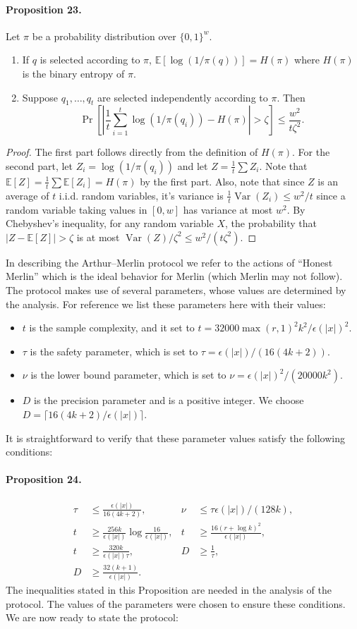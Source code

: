\documentclass[10pt,a4paper]{article}
\begin{document}
\paragraph{Proposition 23.} Let $\pi$ be a probability distribution over $\{0,1\}^w$.
\begin{enumerate}\item If $q$ is selected according to $\pi$, $\mathbb E[\log(1/\pi(q))]=H(\pi)$ where $H(\pi)$ is the binary entropy of $\pi$.
\item Suppose $q_1,\ldots,q_t$ are selected independently according to $\pi$. Then
\[\Pr\left[\left|\frac1t\sum_{i=1}^t\log(1/\pi(q_i))-H(\pi)\right|>\zeta\right]\le\frac{w^2}{t\zeta^2}.\]\end{enumerate}
\begin{proof}The first part follows directly from the definition of $H(\pi)$. For the second part, let $Z_i=\log(1/\pi(q_i))$ and let $Z=\frac1t\sum Z_i$. Note that $\mathbb E[Z]=\frac1t\sum\mathbb E[Z_i]=H(\pi)$ by the first part. Also, note that since $Z$ is an average of $t$ i.i.d. random variables, it's variance is $\frac1t\operatorname{Var}(Z_i)\le w^2/t$ since a random variable taking values in $[0,w]$ has variance at most $w^2$. By Chebyshev's inequality, for any random variable $X$, the probability that $|Z-\mathbb E[Z]|>\zeta$ is at most $\operatorname{Var}(Z)/\zeta^2\le w^2/(t\zeta^2)$.\end{proof}
In describing the Arthur--Merlin protocol we refer to the actions of ``Honest Merlin'' which is the ideal behavior for Merlin (which Merlin may not follow). The protocol makes use of several parameters, whose values are determined by the analysis. For reference we list these parameters here with their values:
\begin{itemize}\item $t$ is the sample complexity, and it set to $t=32000\max(r,1)^2k^2/\epsilon(|x|)^2$.
\item $\tau$ is the safety parameter, which is set to $\tau=\epsilon(|x|)/(16(4k+2))$.
\item $\nu$ is the lower bound parameter, which is set to $\nu=\epsilon(|x|)^2/(20000k^2)$.
\item $D$ is the precision parameter and is a positive integer. We choose $D=\lceil16(4k+2)/\epsilon(|x|)\rceil$.\end{itemize}
It is straightforward to verify that these parameter values satisfy the following conditions:
\paragraph{Proposition 24.}
\begin{align*}
\tau&\le\frac{\epsilon(|x|)}{16(4k+2)},& \nu&\le\tau\epsilon(|x|)/(128k),\\
t&\ge\frac{256k}{\epsilon(|x|)}\log\frac{16}{\epsilon(|x|)},& t&\ge\frac{16(r+\log k)^2}{\epsilon(|x|)},\\
t&\ge\frac{320k}{\epsilon(|x|)\tau},&D&\ge\frac1\tau,\\
D&\ge\frac{32(k+1)}{\epsilon(|x|)}.&&
\end{align*}
The inequalities stated in this Proposition are needed in the analysis of the protocol. The values of the parameters were chosen to ensure these conditions. We are now ready to state the protocol:
\end{document}
